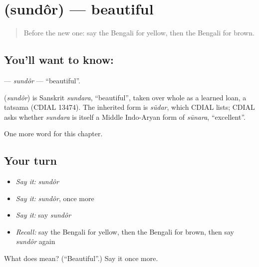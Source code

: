 \section[\texorpdfstring{\bn{সুন্দর} (sundôr)}{সুন্দর (sundôr)}]{ (sundôr) — beautiful}

\label{lesson:BN-C77-sundor}



\begin{quote}
Before the new one: say the Bengali for yellow, then the Bengali for brown.
\end{quote}

\subsection*{You'll want to know: }
\textbf{} — \emph{sundôr} — \textquotedblleft{}beautiful\textquotedblright{}.

\begin{cousinweb}
\textbf{} (\emph{sundôr}) is Sanskrit \emph{sundara}, \textquotedblleft{}beautiful\textquotedblright{}, taken over whole as a learned loan, a tatsama (CDIAL 13474). The inherited form is \emph{sũdar}, which CDIAL lists; CDIAL asks whether \emph{sundara} is itself a Middle Indo-Aryan form of \emph{sūnara}, \textquotedblleft{}excellent\textquotedblright{}.
\end{cousinweb}

\begin{grammarlens}[title={What you've built}]
One more word for this chapter.
\end{grammarlens}

\subsection*{Your turn}
\begin{itemize}
\raggedright
  \item \emph{Say it:} \emph{sundôr}
  \item \emph{Say it:} \emph{sundôr}, once more
  \item \emph{Say it:} say \emph{sundôr}
  \item \emph{Recall:} say the Bengali for yellow, then the Bengali for brown, then say \emph{sundôr} again
\end{itemize}

\begin{tcolorbox}[breakable,colback=teal!4,colframe=teal!35!black,title={Before you move on}]
What does  mean? (\textquotedblleft{}Beautiful\textquotedblright{}.) Say it once more.
\end{tcolorbox}
